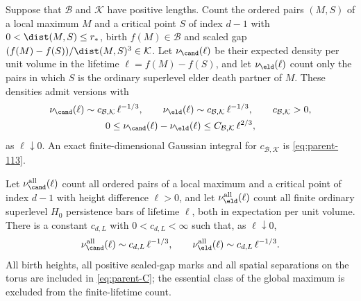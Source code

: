 \begin{theorem}\label{thm:parent-B}
Suppose that $\mathcal B$ and $\mathcal K$ have positive lengths. Count the ordered pairs $(M,S)$ of a local maximum $M$ and a critical point $S$ of index $d-1$ with $0<\dist(M,S)\le r_*$, birth $f(M)\in\mathcal B$ and scaled gap $(f(M)-f(S))/\dist(M,S)^3\in\mathcal K$. Let $\nu_\cand(\ell)$ be their expected density per unit volume in the lifetime $\ell=f(M)-f(S)$, and let $\nu_\eld(\ell)$ count only the pairs in which $S$ is the ordinary superlevel elder death partner of $M$. These densities admit versions with
\begin{equation}\label{eq:parent-B}
\begin{gathered}
\nu_\cand(\ell)\sim c_{\mathcal B,\mathcal K}\,\ell^{-1/3},\qquad \nu_\eld(\ell)\sim c_{\mathcal B,\mathcal K}\,\ell^{-1/3},\qquad c_{\mathcal B,\mathcal K}>0,\\
0\le\nu_\cand(\ell)-\nu_\eld(\ell)\le C_{\mathcal B,\mathcal K}\,\ell^{2/3},
\end{gathered}
\end{equation}
as $\ell\downarrow0$. An exact finite-dimensional Gaussian integral for $c_{\mathcal B,\mathcal K}$ is \eqref{eq:parent-113}.
\end{theorem}

\begin{theorem}\label{thm:parent-C}
Let $\nu^{\rm all}_\cand(\ell)$ count all ordered pairs of a local maximum and a critical point of index $d-1$ with height difference $\ell>0$, and let $\nu^{\rm all}_\eld(\ell)$ count all finite ordinary superlevel $H_0$ persistence bars of lifetime $\ell$, both in expectation per unit volume. There is a constant $c_{d,L}$ with $0<c_{d,L}<\infty$ such that, as $\ell\downarrow0$,
\begin{equation}\label{eq:parent-C}
\nu^{\rm all}_\cand(\ell)\sim c_{d,L}\,\ell^{-1/3},\qquad \nu^{\rm all}_\eld(\ell)\sim c_{d,L}\,\ell^{-1/3}.
\end{equation}
All birth heights, all positive scaled-gap marks and all spatial separations on the torus are included in \eqref{eq:parent-C}; the essential class of the global maximum is excluded from the finite-lifetime count.
\end{theorem}

